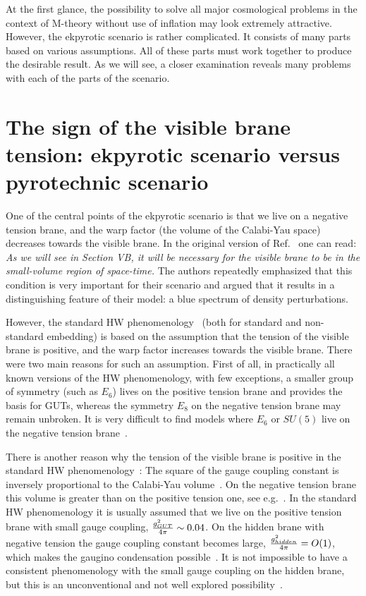 \documentclass[a4paper,12pt]{article}
\begin{document}
At the first glance, the possibility to solve all major cosmological problems in the context of M-theory without use of inflation may look extremely attractive. However, the ekpyrotic scenario is rather complicated. It consists of many parts based on various assumptions. All of these parts must work together to produce the desirable result. As we will see, a closer examination reveals many problems with each of the parts of the scenario.

\section{The sign of the visible brane tension: ekpyrotic scenario versus pyrotechnic scenario}

One of the central points of the ekpyrotic scenario is that we live on a negative tension brane, and the warp factor (the volume of the Calabi-Yau space) decreases towards the visible brane.
In the original version of Ref.~\cite{KOST} one can read: {\it As we   
will see in Section VB,   it will be   necessary  for the visible brane to   
be in the small-volume region of space-time.}   The authors repeatedly emphasized that this condition is very important for their scenario and argued that it results in a distinguishing feature
of their model: a blue spectrum of density perturbations. 

However, the standard HW phenomenology~\cite{HoravaWitten} (both for standard and non-standard embedding) is based  on the assumption that the tension of the visible brane is positive, and   the warp factor increases towards the visible brane.  There were two main reasons for such an assumption. First of all, in practically all known  versions of the HW phenomenology,  with few exceptions,  a smaller group of symmetry (such as $E_6$) lives on the positive tension brane and provides the basis for GUTs, whereas the symmetry $E_8$ on the negative tension brane may remain unbroken. It is very difficult   to find  models where $E_6$ or $SU(5)$ live on the negative tension brane~\cite{Benakli:1999sy,Donagi:2001fs}.  

There is another reason why the tension of the visible brane is positive in the standard HW phenomenology~\cite{HoravaWitten}:  The square of the gauge coupling constant is inversely proportional to the Calabi-Yau volume~\cite{HoravaWitten}. On the negative tension brane this volume is greater than on the positive tension one, see e.g.~\cite{KOST}. In the standard HW phenomenology it is usually assumed that we live on the positive tension brane with small gauge coupling, ${g^2_{GUT}\over 4\pi} \sim 0.04$. On the hidden brane with negative tension the gauge coupling constant becomes large, ${g^2_{hidden}\over 4\pi} = O(1)$, which makes the gaugino condensation possible~\cite{HoravaWitten}. It is not  impossible to have a consistent phenomenology with the small gauge coupling on the hidden brane, but this is an unconventional and not well explored possibility~\cite{Benakli:1999sy}.  
 
\end{document}
